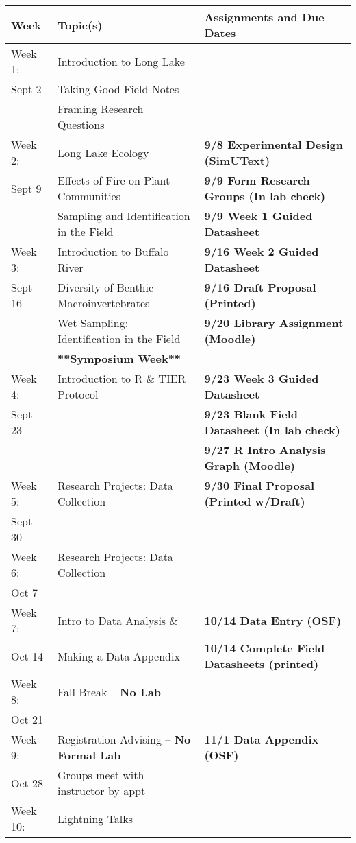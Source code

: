 \documentclass{tufte-handout}
\begin{document}
\begin{tabular}{l l l}
Week & Topic(s) & Assignments and Due Dates \\
\hline
Week 1: & Introduction to Long Lake &  \\ 
Sept 2 & Taking Good Field Notes \\
& Framing Research Questions \\
\hline
Week 2: & Long Lake Ecology & \textbf{9/8 Experimental Design (SimUText)}\\
Sept 9 & Effects of Fire on Plant Communities &\textbf{9/9 Form Research Groups (In lab check)} \\
& Sampling and Identification in the Field &  \textbf{9/9 Week 1 Guided Datasheet}\\
\hline
Week 3: & Introduction to Buffalo River & \textbf{9/16 Week 2 Guided Datasheet} \\
Sept 16 & Diversity of Benthic Macroinvertebrates & \textbf{9/16 Draft Proposal (Printed)} \\
& Wet Sampling: Identification in the Field  & \textbf{9/20 Library Assignment (Moodle)}\\
 & \textbf{**Symposium Week**} \\
\hline
Week 4: & Introduction to R \& TIER Protocol & \textbf{9/23 Week 3 Guided Datasheet}  \\
Sept 23 &  & \textbf{9/23 Blank Field Datasheet (In lab check)} \\
 & &  \textbf{9/27 R Intro Analysis Graph (Moodle)}\\
\hline
Week 5: & Research Projects: Data Collection & \textbf{9/30 Final Proposal (Printed w/Draft)}\\
Sept 30 & & \\
\hline 
Week 6: & Research Projects: Data Collection &  \\
Oct 7 & \\
\hline 
Week 7: & Intro to Data Analysis \& &  \textbf{10/14 Data Entry (OSF)} \\
Oct 14 & Making a Data Appendix & \textbf{10/14 Complete Field Datasheets (printed)}\\
\hline
Week 8: & Fall Break -- \textbf{No Lab} & \\
Oct 21 & \\
\hline 
Week 9: & Registration Advising -- \textbf{No Formal Lab} & \textbf{11/1 Data Appendix (OSF)} \\
Oct 28 & Groups meet with instructor by appt \\
\hline 
Week 10: & Lightning Talks &  \\

\end{tabular}
\end{document}
